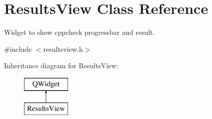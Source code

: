 \hypertarget{class_results_view}{\section{Results\-View Class Reference}
\label{class_results_view}
}


Widget to show cppcheck progressbar and result.  




{\ttfamily \#include $<$resultsview.\-h$>$}

Inheritance diagram for Results\-View\-:\begin{figure}[H]
\begin{center}
\leavevmode
\includegraphics[height=2.000000cm]{class_results_view}
\end{center}
\end{figure}
